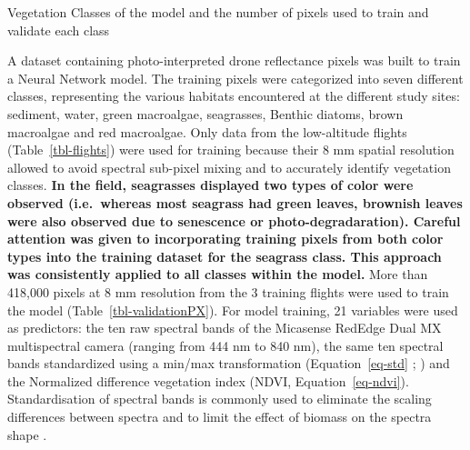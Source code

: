 \documentclass[
  number]{elsarticle}
\begin{document}
\begin{table}

\caption{\label{tbl-validationPX}Vegetation Classes of the model and the
number of pixels used to train and validate each class}


\end{table}%

A dataset containing photo-interpreted drone reflectance pixels was
built to train a Neural Network model. The training pixels were
categorized into seven different classes, representing the various
habitats encountered at the different study sites: sediment, water,
green macroalgae, seagrasses, Benthic diatoms, brown macroalgae and red
macroalgae. Only data from the low-altitude flights
(Table~\ref{tbl-flights}) were used for training because their 8 mm
spatial resolution allowed to avoid spectral sub-pixel mixing and to
accurately identify vegetation classes. \textbf{In the field, seagrasses
displayed two types of color were observed (i.e.~whereas most seagrass
had green leaves, brownish leaves were also observed due to senescence
or photo-degradaration). Careful attention was given to incorporating
training pixels from both color types into the training dataset for the
seagrass class. This approach was consistently applied to all classes
within the model.} More than 418,000 pixels at 8 mm resolution from the
3 training flights were used to train the model
(Table~\ref{tbl-validationPX}). For model training, 21 variables were
used as predictors: the ten raw spectral bands of the Micasense RedEdge
Dual MX multispectral camera (ranging from 444 nm to 840 nm), the same
ten spectral bands standardized using a min/max transformation
(Equation~\ref{eq-std} ; \citep{Cao2017}) and the Normalized difference
vegetation index (NDVI, Equation~\ref{eq-ndvi}). Standardisation of
spectral bands is commonly used to eliminate the scaling differences
between spectra and to limit the effect of biomass on the spectra shape
\citep{Douay2022, Davies2023}.
\end{document}
